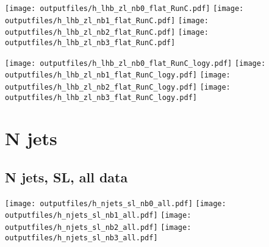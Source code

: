 \documentclass[11pt]{article}
\begin{document}
    \noindent
     \texttt{[image: outputfiles/h\_lhb\_zl\_nb0\_flat\_RunC.pdf]}
     \texttt{[image: outputfiles/h\_lhb\_zl\_nb1\_flat\_RunC.pdf]}
     \texttt{[image: outputfiles/h\_lhb\_zl\_nb2\_flat\_RunC.pdf]}
     \texttt{[image: outputfiles/h\_lhb\_zl\_nb3\_flat\_RunC.pdf]}

    \noindent
     \texttt{[image: outputfiles/h\_lhb\_zl\_nb0\_flat\_RunC\_logy.pdf]}
     \texttt{[image: outputfiles/h\_lhb\_zl\_nb1\_flat\_RunC\_logy.pdf]}
     \texttt{[image: outputfiles/h\_lhb\_zl\_nb2\_flat\_RunC\_logy.pdf]}
     \texttt{[image: outputfiles/h\_lhb\_zl\_nb3\_flat\_RunC\_logy.pdf]}

   \clearpage














  \clearpage
   \section{ N jets }

    \subsection{ N jets, SL, all data}

    \noindent
     \texttt{[image: outputfiles/h\_njets\_sl\_nb0\_all.pdf]}
     \texttt{[image: outputfiles/h\_njets\_sl\_nb1\_all.pdf]}
     \texttt{[image: outputfiles/h\_njets\_sl\_nb2\_all.pdf]}
     \texttt{[image: outputfiles/h\_njets\_sl\_nb3\_all.pdf]}
\end{document}
